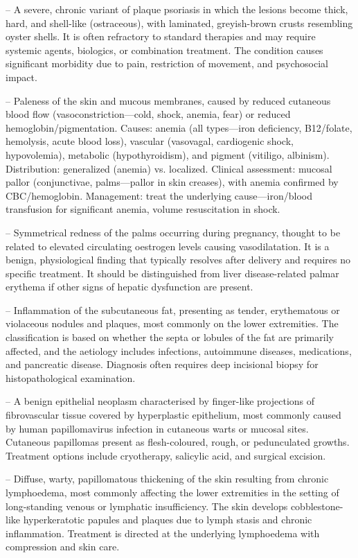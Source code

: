 -- A severe, chronic variant of plaque psoriasis in which the lesions become thick, hard, and shell-like (ostraceous), with laminated, greyish-brown crusts resembling oyster shells. It is often refractory to standard therapies and may require systemic agents, biologics, or combination treatment. The condition causes significant morbidity due to pain, restriction of movement, and psychosocial impact.

-- Paleness of the skin and mucous membranes, caused by reduced cutaneous blood flow (vasoconstriction—cold, shock, anemia, fear) or reduced hemoglobin/pigmentation. Causes: anemia (all types—iron deficiency, B12/folate, hemolysis, acute blood loss), vascular (vasovagal, cardiogenic shock, hypovolemia), metabolic (hypothyroidism), and pigment (vitiligo, albinism). Distribution: generalized (anemia) vs. localized. Clinical assessment: mucosal pallor (conjunctivae, palms—pallor in skin creases), with anemia confirmed by CBC/hemoglobin. Management: treat the underlying cause—iron/blood transfusion for significant anemia, volume resuscitation in shock.

-- Symmetrical redness of the palms occurring during pregnancy, thought to be related to elevated circulating oestrogen levels causing vasodilatation. It is a benign, physiological finding that typically resolves after delivery and requires no specific treatment. It should be distinguished from liver disease-related palmar erythema if other signs of hepatic dysfunction are present.

-- Inflammation of the subcutaneous fat, presenting as tender, erythematous or violaceous nodules and plaques, most commonly on the lower extremities. The classification is based on whether the septa or lobules of the fat are primarily affected, and the aetiology includes infections, autoimmune diseases, medications, and pancreatic disease. Diagnosis often requires deep incisional biopsy for histopathological examination.

-- A benign epithelial neoplasm characterised by finger-like projections of fibrovascular tissue covered by hyperplastic epithelium, most commonly caused by human papillomavirus infection in cutaneous warts or mucosal sites. Cutaneous papillomas present as flesh-coloured, rough, or pedunculated growths. Treatment options include cryotherapy, salicylic acid, and surgical excision.

-- Diffuse, warty, papillomatous thickening of the skin resulting from chronic lymphoedema, most commonly affecting the lower extremities in the setting of long-standing venous or lymphatic insufficiency. The skin develops cobblestone-like hyperkeratotic papules and plaques due to lymph stasis and chronic inflammation. Treatment is directed at the underlying lymphoedema with compression and skin care.

